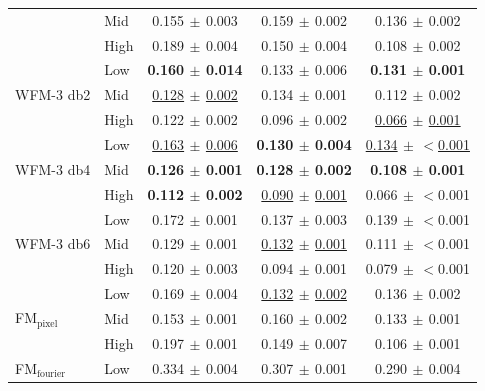 \begin{table}[ht]
{\begin{tabular}{llccc}
 & Mid & 0.155{\scriptsize$\,\pm\,$0.003} & 0.159{\scriptsize$\,\pm\,$0.002} & 0.136{\scriptsize$\,\pm\,$0.002} \\
 & High & 0.189{\scriptsize$\,\pm\,$0.004} & 0.150{\scriptsize$\,\pm\,$0.004} & 0.108{\scriptsize$\,\pm\,$0.002} \\
\midrule
\multirow{3}{*}{WFM-3 db2} & Low & \textbf{0.160{\scriptsize$\,\pm\,$0.014}} & 0.133{\scriptsize$\,\pm\,$0.006} & \textbf{0.131{\scriptsize$\,\pm\,$0.001}} \\
 & Mid & \underline{0.128{\scriptsize$\,\pm\,$0.002}} & 0.134{\scriptsize$\,\pm\,$0.001} & 0.112{\scriptsize$\,\pm\,$0.002} \\
 & High & 0.122{\scriptsize$\,\pm\,$0.002} & 0.096{\scriptsize$\,\pm\,$0.002} & \underline{0.066{\scriptsize$\,\pm\,$0.001}} \\
\midrule
\multirow{3}{*}{WFM-3 db4} & Low & \underline{0.163{\scriptsize$\,\pm\,$0.006}} & \textbf{0.130{\scriptsize$\,\pm\,$0.004}} & \underline{0.134{\scriptsize$\,\pm\,$$<$0.001}} \\
 & Mid & \textbf{0.126{\scriptsize$\,\pm\,$0.001}} & \textbf{0.128{\scriptsize$\,\pm\,$0.002}} & \textbf{0.108{\scriptsize$\,\pm\,$0.001}} \\
 & High & \textbf{0.112{\scriptsize$\,\pm\,$0.002}} & \underline{0.090{\scriptsize$\,\pm\,$0.001}} & 0.066{\scriptsize$\,\pm\,$$<$0.001} \\
\midrule
\multirow{3}{*}{WFM-3 db6} & Low & 0.172{\scriptsize$\,\pm\,$0.001} & 0.137{\scriptsize$\,\pm\,$0.003} & 0.139{\scriptsize$\,\pm\,$$<$0.001} \\
 & Mid & 0.129{\scriptsize$\,\pm\,$0.001} & \underline{0.132{\scriptsize$\,\pm\,$0.001}} & 0.111{\scriptsize$\,\pm\,$$<$0.001} \\
 & High & 0.120{\scriptsize$\,\pm\,$0.003} & 0.094{\scriptsize$\,\pm\,$0.001} & 0.079{\scriptsize$\,\pm\,$$<$0.001} \\
\midrule
\multirow{3}{*}{FM$_\text{pixel}$} & Low & 0.169{\scriptsize$\,\pm\,$0.004} & \underline{0.132{\scriptsize$\,\pm\,$0.002}} & 0.136{\scriptsize$\,\pm\,$0.002} \\
 & Mid & 0.153{\scriptsize$\,\pm\,$0.001} & 0.160{\scriptsize$\,\pm\,$0.002} & 0.133{\scriptsize$\,\pm\,$0.001} \\
 & High & 0.197{\scriptsize$\,\pm\,$0.001} & 0.149{\scriptsize$\,\pm\,$0.007} & 0.106{\scriptsize$\,\pm\,$0.001} \\
\midrule
\multirow{3}{*}{FM$_\text{fourier}$} & Low & 0.334{\scriptsize$\,\pm\,$0.004} & 0.307{\scriptsize$\,\pm\,$0.001} & 0.290{\scriptsize$\,\pm\,$0.004} \\

\end{tabular}}
\end{table}
